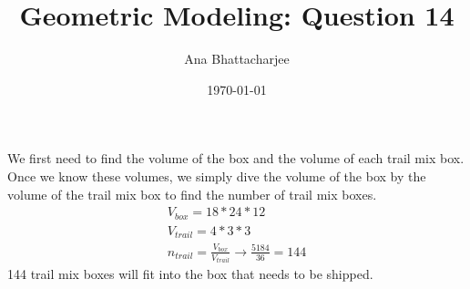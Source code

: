 \documentclass{article}
\begin{document}
\title{Geometric Modeling: Question 14}
\author{Ana Bhattacharjee}
\date{\today}
\maketitle
\begin{center}
We first need to find the volume of the box and the volume of each trail mix box. Once we know these volumes, we simply dive the volume of the box by the volume of the trail mix box to find the number of trail mix boxes.
\begin{align}
  V_{box} = 18 * 24 * 12 \\
  V_{trail} = 4 * 3 * 3 \\
  n_{trail} = \frac{V_{box}}{V_{trail}} \rightarrow \frac{5184}{36} = 144
\end{align}
144 trail mix boxes will fit into the box that needs to be shipped.
\end{center}
\end{document}
